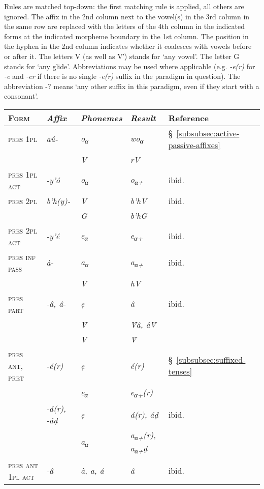 \documentclass[a4paper, 12pt, twoside, openright, final]{book}
\let \nf \normalfont
\let \w \textit
\let \Sub \textsubscript
\begin{document}
Rules are matched top-down: the first matching rule is applied, all others are ignored. The affix in the 2nd column next to the
vowel(s) in the 3rd column in the same row are replaced with the letters of the 4th column in the indicated forms at the
indicated morpheme boundary in the 1st column. The position in the hyphen in the 2nd column indicates whether it coalesces
with vowels before or after it. The letters V (as well as V′) stands for ‘any vowel’. The letter G stands for
‘any glide’. Abbreviations may be used where applicable (e.g. \w{-e(r)} for \w{-e} and \w{-er} if there is no single \w{-e(r)}
suffix in the paradigm in question). The abbreviation -? means ‘any other suffix in this paradigm, even if they
start with a consonant’.

\medskip
{\centering
\noindent
\begin{longtable}{@{}>{\scshape}l|>{\it}p{5em}|>{\it}l|>{\it}l|l}
\nf Form    & \nf Affix & \nf Phonemes & \nf Result & Reference \\\hline\hline
pres 1pl          & aú-     & o\Sub α  & wo\Sub α & §~\ref{subsubsec:active-passive-affixes} \\
                  &         &\nf V & r\nf V \\\hline
pres 1pl act      & -y’ó    & o\Sub α  & o\Sub{α+} &ibid. \\\hline
pres 2pl          & b’h(y)- &\nf V & b’h\nf V &ibid. \\
                  &         &\nf G & b’h\nf G \\\hline
pres 2pl act      & -y’é    & e\Sub α  & e\Sub{α+} &ibid.\\\hline
pres inf pass     & à-      & a\Sub α& a\Sub {α+}&ibid. \\
                  &         &\nf V & h\nf V \\\hline
pres part         & -â, â-  & ẹ & â &ibid. \\
                  &         &\nf V̂ & {\nf V̂}â, â{\nf V̂} \\
                  &         &\nf V &\nf V̂ \\\hline\hline
pres ant, pret    & -é(r)   & ẹ & é(r) &§~\ref{subsubsec:suffixed-tenses}\\
                  &         &e\Sub α & e\Sub{α+}(r) \\
                  & -á(r), -áḍ  & ẹ & á(r), áḍ &ibid. \\
                  &         &a\Sub α & a\Sub{α+}(r), a\Sub{α+}ḍ \\\hline
pres ant 1pl act  & -â      &à, a, á & â & ibid.\\\hline\hline

\end{longtable}}
\end{document}
